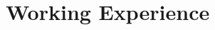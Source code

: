 \documentclass[letterpaper,10pt]{article}
\begin{document}
\begin{itemize}
	
	

	
\end{itemize}





\section{Working Experience}
\end{document}
